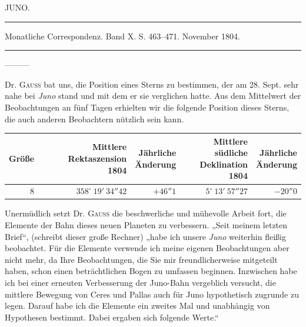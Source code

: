 \clearpage
{}
\hypertarget{native-261-lower}{}
\begin{center}
JUNO.

\rule{0.75\linewidth}{0.4pt}

Monatliche Correspondenz. Band X. S. 463–471. November 1804.

\rule{0.75\linewidth}{0.4pt}
\end{center}

\noindent—\quad—\quad—\par
Dr. \textsc{Gauss} bat uns, die Position eines Sterns zu bestimmen, der am 28. Sept. sehr nahe bei \emph{Juno} stand und mit dem er sie verglichen hatte. Aus dem Mittelwert der Beobachtungen an fünf Tagen erhielten wir die folgende Position dieses Sterns, die auch anderen Beobachtern nützlich sein kann.

\begin{center}
\begingroup\fontsize{9}{11}\selectfont\setlength{\tabcolsep}{3pt}\renewcommand{\arraystretch}{1.1}
\begin{tabular}{r|r|r|r|r}
Größe & \shortstack{Mittlere Rektaszension\\1804} & \shortstack{Jährliche\\Änderung} & \shortstack{Mittlere südliche\\Deklination\\1804} & \shortstack{Jährliche\\Änderung}\\ \hline
8 & $358^\circ\ 19'\ 34''42$ & $+46''1$ & $5^\circ\ 13'\ 57''27$ & $-20''0$ \\
\end{tabular}\endgroup
\end{center}


Unermüdlich setzt Dr. \textsc{Gauss} die beschwerliche und mühevolle Arbeit fort, die Elemente der Bahn dieses neuen Planeten zu verbessern. „Seit meinem letzten Brief“, (schreibt dieser große Rechner) „habe ich unsere \emph{Juno} weiterhin fleißig beobachtet. Für die Elemente verwende ich meine eigenen Beobachtungen aber nicht mehr, da Ihre Beobachtungen, die Sie mir freundlicherweise mitgeteilt haben, schon einen beträchtlichen Bogen zu umfassen beginnen. Inzwischen habe ich bei einer erneuten Verbesserung der Juno-Bahn vergeblich versucht, die mittlere Bewegung von Ceres und Pallas auch für Juno hypothetisch zugrunde zu legen. Darauf habe ich die Elemente ein zweites Mal und unabhängig von Hypothesen bestimmt. Dabei ergaben sich folgende Werte.“

